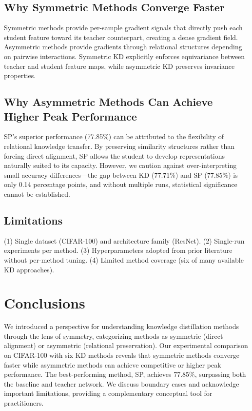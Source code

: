 \documentclass[symmetry,article,submit,pdftex,moreauthors]{Definitions/mdpi}
\begin{document}
\subsection{Why Symmetric Methods Converge Faster}

Symmetric methods provide per-sample gradient signals that directly push each student feature toward its teacher counterpart, creating a dense gradient field. Asymmetric methods provide gradients through relational structures depending on pairwise interactions. Symmetric KD explicitly enforces equivariance between teacher and student feature maps, while asymmetric KD preserves invariance properties.

\subsection{Why Asymmetric Methods Can Achieve Higher Peak Performance}

SP's superior performance (77.85\%) can be attributed to the flexibility of relational knowledge transfer. By preserving similarity structures rather than forcing direct alignment, SP allows the student to develop representations naturally suited to its capacity. However, we caution against over-interpreting small accuracy differences---the gap between KD (77.71\%) and SP (77.85\%) is only 0.14 percentage points, and without multiple runs, statistical significance cannot be established.

\subsection{Limitations}

(1) Single dataset (CIFAR-100) and architecture family (ResNet). (2) Single-run experiments per method. (3) Hyperparameters adopted from prior literature without per-method tuning. (4) Limited method coverage (six of many available KD approaches).

\section{Conclusions}

We introduced a perspective for understanding knowledge distillation methods through the lens of symmetry, categorizing methods as symmetric (direct alignment) or asymmetric (relational preservation). Our experimental comparison on CIFAR-100 with six KD methods reveals that symmetric methods converge faster while asymmetric methods can achieve competitive or higher peak performance. The best-performing method, SP, achieves 77.85\%, surpassing both the baseline and teacher network. We discuss boundary cases and acknowledge important limitations, providing a complementary conceptual tool for practitioners.
\end{document}
